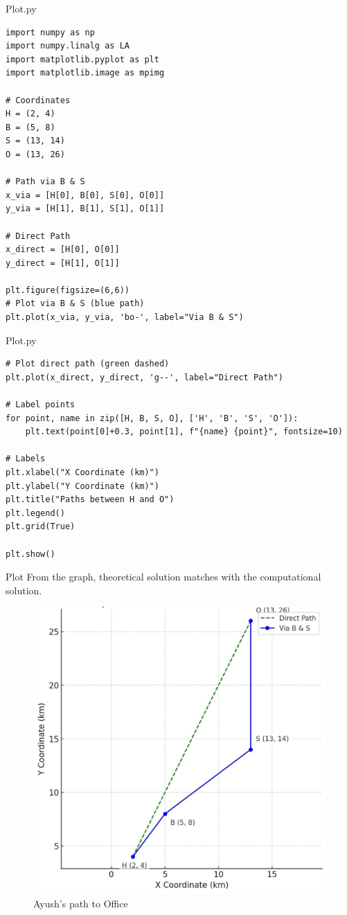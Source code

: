 \documentclass{beamer}
\begin{document}
\begin{frame}[fragile]{Plot.py}
\begin{lstlisting}
import numpy as np
import numpy.linalg as LA
import matplotlib.pyplot as plt
import matplotlib.image as mpimg

# Coordinates
H = (2, 4)
B = (5, 8)
S = (13, 14)
O = (13, 26)

# Path via B & S
x_via = [H[0], B[0], S[0], O[0]]
y_via = [H[1], B[1], S[1], O[1]]

# Direct Path
x_direct = [H[0], O[0]]
y_direct = [H[1], O[1]]

plt.figure(figsize=(6,6))
# Plot via B & S (blue path)
plt.plot(x_via, y_via, 'bo-', label="Via B & S")

\end{lstlisting}
\end{frame}

\begin{frame}[fragile]{Plot.py}
\begin{lstlisting}
# Plot direct path (green dashed)
plt.plot(x_direct, y_direct, 'g--', label="Direct Path")

# Label points
for point, name in zip([H, B, S, O], ['H', 'B', 'S', 'O']):
    plt.text(point[0]+0.3, point[1], f"{name} {point}", fontsize=10)

# Labels
plt.xlabel("X Coordinate (km)")
plt.ylabel("Y Coordinate (km)")
plt.title("Paths between H and O")
plt.legend()
plt.grid(True)

plt.show()
\end{lstlisting}
\end{frame}

\begin{frame}{Plot}
From the graph, theoretical solution matches with the computational solution.

\begin{figure}[H]
\centering
\includegraphics[width=0.5\columnwidth]{figs/graph.png}
 \caption*{Ayush's path to Office}
\label{fig:graph.png}
\end{figure}
\end{frame}
\end{document}
